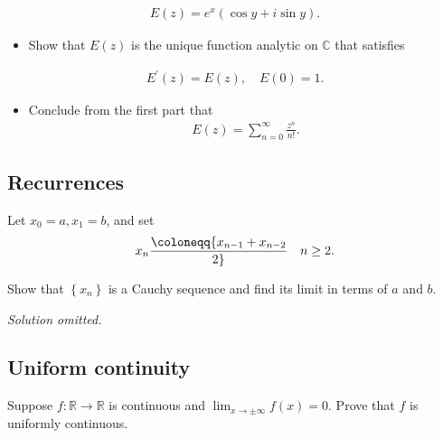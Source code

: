 \begin{align*}
E(z)=e^{x}(\cos y+i \sin y) .
\end{align*}

\begin{itemize}
\tightlist
\item
  Show that \(E(z)\) is the unique function analytic on \(\mathbb{C}\)
  that satisfies
\end{itemize}

\begin{align*}
E^{\prime}(z)=E(z), \quad E(0)=1 .
\end{align*}

\begin{itemize}
\tightlist
\item
  Conclude from the first part that
  \begin{align*}
  E(z)=\sum_{n=0}^{\infty} \frac{z^{n}}{n !}
  .\end{align*}
\end{itemize}

\hypertarget{recurrences}{%
\subsection{Recurrences}\label{recurrences}}

\begin{problem}[?]

Let \(x_0 = a, x_1 = b\), and set
\begin{align*}  
x_n \coloneqq{x_{n-1} + x_{n-2} \over 2} \quad n\geq 2
.\end{align*}

Show that \(\left\{{x_n}\right\}\) is a Cauchy sequence and find its
limit in terms of \(a\) and \(b\).

\end{problem}

\emph{Solution omitted.}

\hypertarget{uniform-continuity}{%
\subsection{Uniform continuity}\label{uniform-continuity}}

\begin{problem}[?]

Suppose \(f:{\mathbb{R}}\to{\mathbb{R}}\) is continuous and
\(\lim_{x\to \pm \infty} f(x) = 0\). Prove that \(f\) is uniformly
continuous.

\end{problem}


